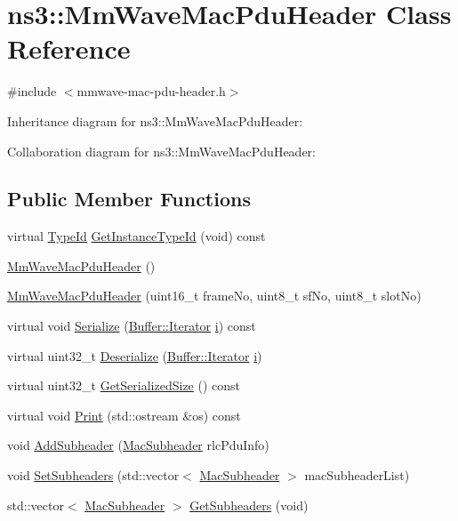 \hypertarget{classns3_1_1MmWaveMacPduHeader}{}\section{ns3\+:\+:Mm\+Wave\+Mac\+Pdu\+Header Class Reference}
\label{classns3_1_1MmWaveMacPduHeader}


{\ttfamily \#include $<$mmwave-\/mac-\/pdu-\/header.\+h$>$}



Inheritance diagram for ns3\+:\+:Mm\+Wave\+Mac\+Pdu\+Header\+:


Collaboration diagram for ns3\+:\+:Mm\+Wave\+Mac\+Pdu\+Header\+:
\subsection*{Public Member Functions}
\begin{DoxyCompactItemize}
\item 
virtual \hyperlink{classns3_1_1TypeId}{Type\+Id} \hyperlink{classns3_1_1MmWaveMacPduHeader_af0133a34179513f9bac714ec8365234d}{Get\+Instance\+Type\+Id} (void) const 
\item 
\hyperlink{classns3_1_1MmWaveMacPduHeader_af160e46d52cacce9ff1d7ed7d4352baf}{Mm\+Wave\+Mac\+Pdu\+Header} ()
\item 
\hyperlink{classns3_1_1MmWaveMacPduHeader_a88fbbe9b355deafd687b2889760997d8}{Mm\+Wave\+Mac\+Pdu\+Header} (uint16\+\_\+t frame\+No, uint8\+\_\+t sf\+No, uint8\+\_\+t slot\+No)
\item 
virtual void \hyperlink{classns3_1_1MmWaveMacPduHeader_af8a7b8df1b9c559287d8fe81ad689a85}{Serialize} (\hyperlink{classns3_1_1Buffer_1_1Iterator}{Buffer\+::\+Iterator} \hyperlink{lte__uplink__power__control_8m_a6f6ccfcf58b31cb6412107d9d5281426}{i}) const 
\item 
virtual uint32\+\_\+t \hyperlink{classns3_1_1MmWaveMacPduHeader_af6df9a674344d70b78a166fde59e16f5}{Deserialize} (\hyperlink{classns3_1_1Buffer_1_1Iterator}{Buffer\+::\+Iterator} \hyperlink{lte__uplink__power__control_8m_a6f6ccfcf58b31cb6412107d9d5281426}{i})
\item 
virtual uint32\+\_\+t \hyperlink{classns3_1_1MmWaveMacPduHeader_aeb7b935bd1a3496b7da97cf78da21391}{Get\+Serialized\+Size} () const 
\item 
virtual void \hyperlink{classns3_1_1MmWaveMacPduHeader_ad4db73b7bf60c8fdea9a13c8b0d1df32}{Print} (std\+::ostream \&os) const 
\item 
void \hyperlink{classns3_1_1MmWaveMacPduHeader_ab67543c260b9c475c6b470eca5d5c5e7}{Add\+Subheader} (\hyperlink{structns3_1_1MacSubheader}{Mac\+Subheader} rlc\+Pdu\+Info)
\item 
void \hyperlink{classns3_1_1MmWaveMacPduHeader_a13a6c8783d5b72bbf4f33d4660e5243c}{Set\+Subheaders} (std\+::vector$<$ \hyperlink{structns3_1_1MacSubheader}{Mac\+Subheader} $>$ mac\+Subheader\+List)
\item 
std\+::vector$<$ \hyperlink{structns3_1_1MacSubheader}{Mac\+Subheader} $>$ \hyperlink{classns3_1_1MmWaveMacPduHeader_a3e824d28de4ea9dfc592ba09e52c7d5b}{Get\+Subheaders} (void)
\end{DoxyCompactItemize}
